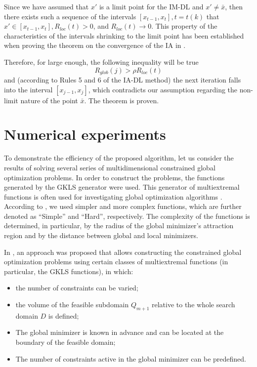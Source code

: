 \documentclass[review]{elsarticle}
\begin{document}
	Since we have assumed that $x'$ is a limit point for the IM-DL and  $x' \neq \bar x$, then there exists such a sequence of the intervals $[x_{t-1}, x_t], t=t(k)$ that $x' \in [x_{t-1}, x_t], R_{loc}(t)>0$, and $R_{loc}(t) \rightarrow 0$. This property of the characteristics of the intervals shrinking to the limit point has been established when proving the theorem on the convergence of the IA in \cite{Sergeyev2013}.

	Therefore, for large enough, the following inequality will be true
\begin{equation}
	R_{glob}(j) > \rho R_{loc}(t)
\end{equation}
and (according to Rules 5 and 6 of the IA-DL method) the next iteration falls into the interval $[x_{j-1}, x_j]$, which contradicts our assumption regarding the non-limit nature of the point $\bar x$. The theorem is proven.



\section{Numerical experiments}
	To demonstrate the efficiency of the proposed algorithm, let us consider the results of solving several series of multidimensional constrained global optimization problems. In order to construct the problems, the functions generated by the GKLS generator \cite{Gaviano2003} were used. This generator of multiextremal functions is often used for investigating global optimization algorithms \cite{Barkalov2018, Paulavicius2014, Sergeyev2015}. According to \cite{Gaviano2003}, we used simpler and more complex functions, which are  further denoted as “Simple” and “Hard”, respectively. The complexity of the functions is determined, in particular, by the radius of the global minimizer's attraction region and by the distance between global and local minimizers.
	
	In \cite{Gergel2017_2, Gergel2019}, an approach was proposed that allows constructing the constrained global optimization problems using certain classes of multiextremal functions (in particular, the GKLS functions), in which:
\begin{itemize}
  \item the number of constraints can be varied;
  \item the volume of the feasible subdomain $Q_{m+1}$ relative to the whole search domain $D$ is defined;
	\item The global minimizer is known in advance and can be located at the boundary of the feasible domain;
	\item The number of constraints active in the global minimizer can be predefined.
\end{itemize}	
\end{document}
